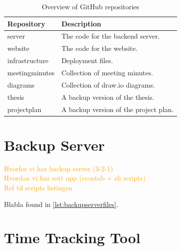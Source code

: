 \begin{table}[h]
    \centering
    \begin{tabular}{l|l}
        \hline
        \textbf{Repository} & \textbf{Description} \\
        \hline
        server & The code for the backend server. \\
        website & The code for the website. \\
        \hline
        infrastructure & Deployment files. \\ 
        meetingminutes & Collection of meeting minutes. \\
        diagrams & Collection of draw.io\tablefootnote{\url{https://www.drawio.com/}} diagrams. \\
        \hline
        thesis & A backup version of the thesis. \\
        projectplan & A backup version of the project plan. \\
        \hline
    \end{tabular}
    \caption[Overview of GitHub repositories]{Overview of GitHub repositories}
    \label{tab:githubrepositories}
\end{table}

\section{Backup Server}\label{sec:devpro:backupserver}

\textcolor{orange}{
Hvorfor vi har backup server (3-2-1) \\
Hvordan vi har satt opp (crontab + sh scripts) \\
Ref til scripts listingen
}

\begin{figure}[h]

\end{figure}

Blabla found in \autoref{lst:backupserverfiles}.

\begin{figure}[h]

\end{figure}

\section{Time Tracking Tool}

